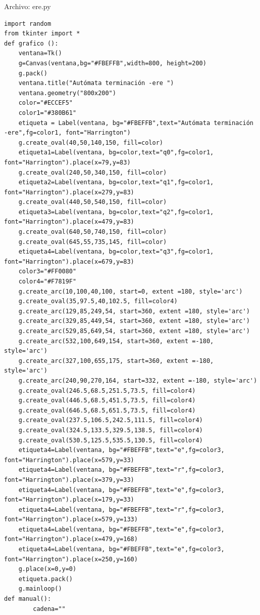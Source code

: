 \documentclass[12pt]{article}
\begin{document}
Archivo: ere.py
\lstset{language=Python, breaklines=true, basicstyle=\footnotesize}
\begin{lstlisting}[frame=single]
import random 
from tkinter import *
def grafico ():
	ventana=Tk()
	g=Canvas(ventana,bg="#FBEFFB",width=800, height=200)
	g.pack()
	ventana.title("Autómata terminación -ere ")
	ventana.geometry("800x200")
	color="#ECCEF5"
	color1="#380B61"
	etiqueta = Label(ventana, bg="#FBEFFB",text="Autómata terminación -ere",fg=color1, font="Harrington")
	g.create_oval(40,50,140,150, fill=color)
	etiqueta1=Label(ventana, bg=color,text="q0",fg=color1, font="Harrington").place(x=79,y=83)
	g.create_oval(240,50,340,150, fill=color)
	etiqueta2=Label(ventana, bg=color,text="q1",fg=color1, font="Harrington").place(x=279,y=83)
	g.create_oval(440,50,540,150, fill=color)
	etiqueta3=Label(ventana, bg=color,text="q2",fg=color1, font="Harrington").place(x=479,y=83)
	g.create_oval(640,50,740,150, fill=color)
	g.create_oval(645,55,735,145, fill=color)
	etiqueta4=Label(ventana, bg=color,text="q3",fg=color1, font="Harrington").place(x=679,y=83)
	color3="#FF0080"
	color4="#F7819F"
	g.create_arc(10,100,40,100, start=0, extent =180, style='arc')
	g.create_oval(35,97.5,40,102.5, fill=color4)
	g.create_arc(129,85,249,54, start=360, extent =180, style='arc')
	g.create_arc(329,85,449,54, start=360, extent =180, style='arc')
	g.create_arc(529,85,649,54, start=360, extent =180, style='arc')
	g.create_arc(532,100,649,154, start=360, extent =-180, style='arc')
	g.create_arc(327,100,655,175, start=360, extent =-180, style='arc')
	g.create_arc(240,90,270,164, start=332, extent =-180, style='arc')
	g.create_oval(246.5,68.5,251.5,73.5, fill=color4)
	g.create_oval(446.5,68.5,451.5,73.5, fill=color4)
	g.create_oval(646.5,68.5,651.5,73.5, fill=color4)
	g.create_oval(237.5,106.5,242.5,111.5, fill=color4)
	g.create_oval(324.5,133.5,329.5,138.5, fill=color4)
	g.create_oval(530.5,125.5,535.5,130.5, fill=color4)
	etiqueta4=Label(ventana, bg="#FBEFFB",text="e",fg=color3, font="Harrington").place(x=579,y=33)
	etiqueta4=Label(ventana, bg="#FBEFFB",text="r",fg=color3, font="Harrington").place(x=379,y=33)
	etiqueta4=Label(ventana, bg="#FBEFFB",text="e",fg=color3, font="Harrington").place(x=179,y=33)
	etiqueta4=Label(ventana, bg="#FBEFFB",text="r",fg=color3, font="Harrington").place(x=579,y=133)
	etiqueta4=Label(ventana, bg="#FBEFFB",text="e",fg=color3, font="Harrington").place(x=479,y=168)
	etiqueta4=Label(ventana, bg="#FBEFFB",text="e",fg=color3, font="Harrington").place(x=250,y=160)
	g.place(x=0,y=0)
	etiqueta.pack()
	g.mainloop() 
def manual():
		cadena=""

\end{lstlisting}
\end{document}
